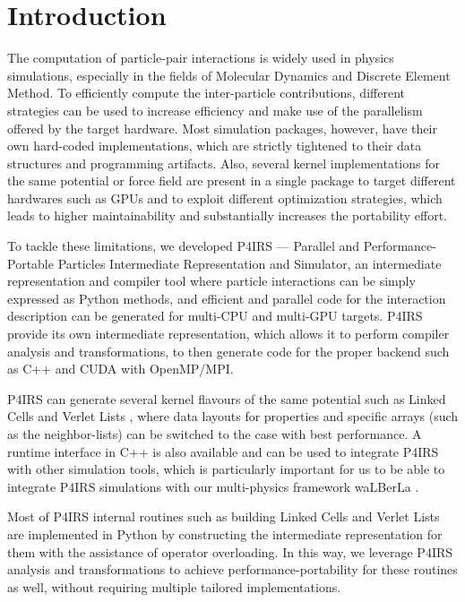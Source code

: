 \documentclass[preprint,12pt]{elsarticle}
\begin{document}

\section{Introduction}
\label{sec:introduction}

The computation of particle-pair interactions is widely used in physics simulations, especially in the fields of Molecular Dynamics and Discrete Element Method.
To efficiently compute the inter-particle contributions, different strategies can be used to increase efficiency and make use of the parallelism offered by the target hardware.
Most simulation packages, however, have their own hard-coded implementations, which are strictly tightened to their data structures and programming artifacts.
Also, several kernel implementations for the same potential or force field are present in a single package to target different hardwares such as GPUs and to exploit different optimization strategies, which leads to higher maintainability and substantially increases the portability effort.

To tackle these limitations, we developed P4IRS --- Parallel and Performance-Portable Particles Intermediate Representation and Simulator, an intermediate representation and compiler tool where particle interactions can be simply expressed as Python methods, and efficient and parallel code for the interaction description can be generated for multi-CPU and multi-GPU targets.
P4IRS provide its own intermediate representation, which allows it to perform compiler analysis and transformations, to then generate code for the proper backend such as C++ and CUDA with OpenMP/MPI.

P4IRS can generate several kernel flavours of the same potential such as Linked Cells \cite{linkedcells} and Verlet Lists \cite{verletlists}, where data layouts for properties and specific arrays (such as the neighbor-lists) can be switched to the case with best performance.
A runtime interface in C++ is also available and can be used to integrate P4IRS with other simulation tools, which is particularly important for us to be able to integrate P4IRS simulations with our multi-physics framework waLBerLa \cite{walberla1,walberla2}.

Most of P4IRS internal routines such as building Linked Cells and Verlet Lists are implemented in Python by constructing the intermediate representation for them with the assistance of operator overloading.
In this way, we leverage P4IRS analysis and transformations to achieve performance-portability for these routines as well, without requiring multiple tailored implementations.
\end{document}
